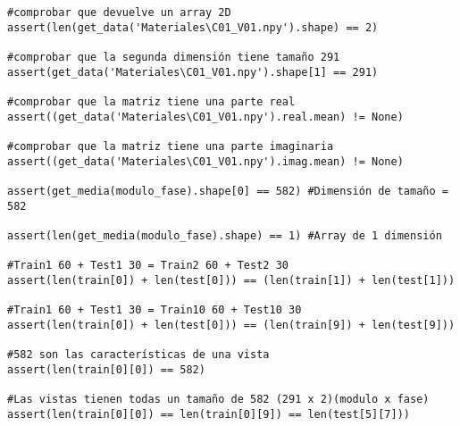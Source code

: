 \begin{verbatim}
#comprobar que devuelve un array 2D
assert(len(get_data('Materiales\C01_V01.npy').shape) == 2) 

#comprobar que la segunda dimensión tiene tamaño 291
assert(get_data('Materiales\C01_V01.npy').shape[1] == 291) 

#comprobar que la matriz tiene una parte real
assert((get_data('Materiales\C01_V01.npy').real.mean) != None) 

#comprobar que la matriz tiene una parte imaginaria
assert((get_data('Materiales\C01_V01.npy').imag.mean) != None) 

assert(get_media(modulo_fase).shape[0] == 582) #Dimensión de tamaño = 582

assert(len(get_media(modulo_fase).shape) == 1) #Array de 1 dimensión

#Train1 60 + Test1 30 = Train2 60 + Test2 30
assert(len(train[0]) + len(test[0])) == (len(train[1]) + len(test[1]))
 
#Train1 60 + Test1 30 = Train10 60 + Test10 30
assert(len(train[0]) + len(test[0])) == (len(train[9]) + len(test[9]))

#582 son las características de una vista
assert(len(train[0][0]) == 582)
 
#Las vistas tienen todas un tamaño de 582 (291 x 2)(modulo x fase)
assert(len(train[0][0]) == len(train[0][9]) == len(test[5][7])) 
\end{verbatim}